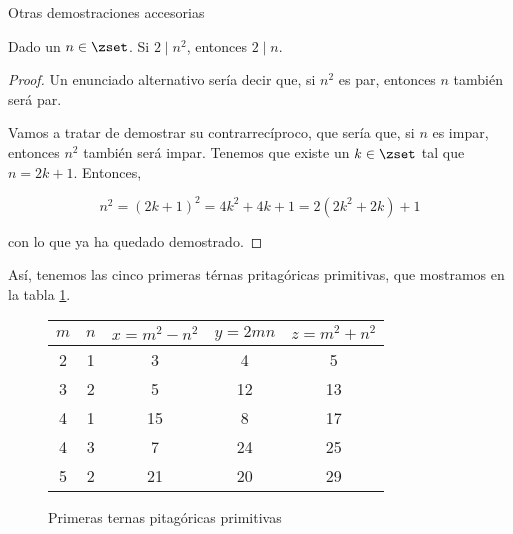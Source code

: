 Otras demostraciones accesorias

\begin{proposition}
  Dado un $n \in \zset$. Si $2 \mid n^2$, entonces $2 \mid n$.
\end{proposition}

\begin{proof}
  Un enunciado alternativo sería decir que, si $n^2$ es par, entonces $n$
  también será par.

  Vamos a tratar de demostrar su contrarrecíproco, que sería que, si $n$ es
  impar, entonces $n^2$ también será impar. Tenemos que existe un $k \in
  \zset$ tal que $n = 2k + 1$. Entonces,

  $$ n^2 = (2k + 1)^2 = 4k^2 + 4k + 1 = 2(2k^2 + 2k) + 1 $$

  \noindent con lo que ya ha quedado demostrado.
\end{proof}

\fi

Así, tenemos las cinco primeras térnas pritagóricas primitivas, que
mostramos en la tabla \ref{primeras-ternas-pitagoricas-primitivas}.

\begin{figure}\caption{Primeras ternas pitagóricas primitivas}
  \centering
  \begin{tabular}{| c | c | c | c | c |}
    \hline
    $m$ & $n$ & $x = m^2 - n^2$ & $y = 2mn$ & $z = m^2 + n^2$ \\
    \hline
    \hline
    2   & 1   & 3   & 4   & 5 \\
    \hline
    3   & 2   & 5   & 12  & 13 \\
    \hline
    4   & 1   & 15  & 8   & 17 \\
    \hline
    4   & 3   & 7   & 24  & 25 \\
    \hline
    5   & 2   & 21  & 20  & 29 \\
    \hline
  \end{tabular}\label{primeras-ternas-pitagoricas-primitivas}
\end{figure}
